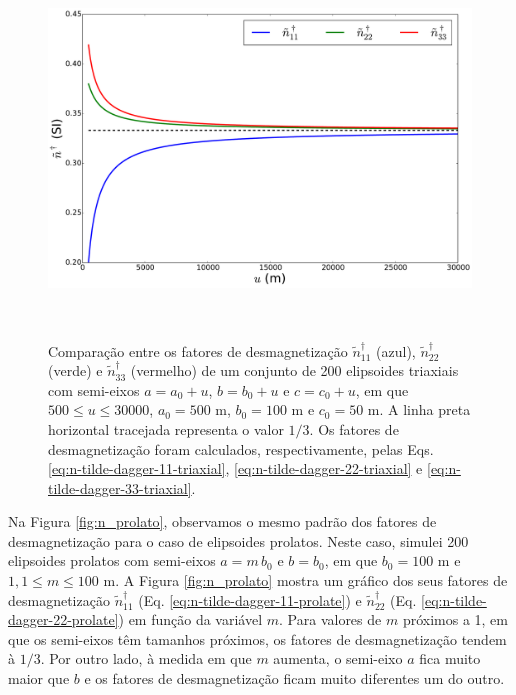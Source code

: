 \begin{figure}[hbt!]
	\centering \includegraphics[width=15cm,height=10cm]{figures/test_n_triaxial}
	\caption[Comparação entre os fatores de desmagnetização
	$\tilde{n}^{\dagger}_{11}$ (azul), $\tilde{n}^{\dagger}_{22}$ (verde) e $\tilde{n}^{\dagger}_{33}$ (vermelho) de um conjunto de 200 elipsoides triaxiais com semi-eixos $a = a_0 + u$, $b = b_0 + u$ e $c = c_0 + u$, em que $500 \le u \le 30000$, $a_0 = 500$ m, $b_0 = 100$ m e $c_0 = 50$ m. A linha preta horizontal tracejada representa o valor $1/3$. Os fatores de desmagnetização foram calculados, respectivamente, pelas Eqs. \ref{eq:n-tilde-dagger-11-triaxial}, \ref{eq:n-tilde-dagger-22-triaxial} e \ref{eq:n-tilde-dagger-33-triaxial}.]
	{Comparação entre os fatores de desmagnetização
		$\tilde{n}^{\dagger}_{11}$ (azul), $\tilde{n}^{\dagger}_{22}$ (verde) e $\tilde{n}^{\dagger}_{33}$ (vermelho) de um conjunto de 200 elipsoides triaxiais com semi-eixos $a = a_0 + u$, $b = b_0 + u$ e $c = c_0 + u$, em que $500 \le u \le 30000$, $a_0 = 500$ m, $b_0 = 100$ m e $c_0 = 50$ m. A linha preta horizontal tracejada representa o valor $1/3$. Os fatores de desmagnetização foram calculados, respectivamente, pelas Eqs. \ref{eq:n-tilde-dagger-11-triaxial}, \ref{eq:n-tilde-dagger-22-triaxial} e \ref{eq:n-tilde-dagger-33-triaxial}.}
	\label{fig:n_triaxial}
\end{figure}

Na Figura \ref{fig:n_prolato}, observamos o mesmo padrão dos fatores de desmagnetização para o caso de elipsoides prolatos. Neste caso, simulei 200 elipsoides prolatos com semi-eixos $a=m\, b_0$ e $b=b_0$, em que $b_0=100$ m e $1,1 \le m \le 100$ m. A Figura \ref{fig:n_prolato} mostra um gráfico dos seus fatores de desmagnetização $\tilde{n}^{\dagger}_{11}$ (Eq. \ref{eq:n-tilde-dagger-11-prolate}) e $\tilde{n}^{\dagger}_{22}$ (Eq. \ref{eq:n-tilde-dagger-22-prolate}) em função da variável $m$.
Para valores de $m$ próximos a 1, em que os semi-eixos têm tamanhos próximos, os fatores de desmagnetização tendem à $1/3$. Por outro lado, à medida em que $m$ aumenta, o semi-eixo $a$ fica muito maior que $b$ e os fatores de desmagnetização ficam muito diferentes um do outro.

